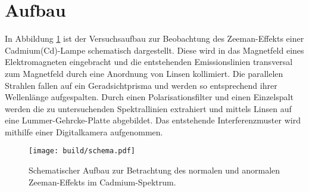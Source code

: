 \section{Aufbau}
\label{sec:Aufbau}

In Abbildung \ref{fig:schema} ist der Versuchsaufbau zur Beobachtung des Zeeman-Effekts einer Cadmium(Cd)-Lampe schematisch dargestellt.
Diese wird in das Magnetfeld eines Elektromagneten eingebracht und die entstehenden Emissionslinien transversal zum Magnetfeld durch eine Anordnung von Linsen kollimiert. Die parallelen Strahlen fallen auf ein Geradsichtprisma und werden so entsprechend ihrer Wellenlänge aufgespalten. Durch einen Polarisationsfilter und einen Einzelspalt werden die zu untersuchenden Spektrallinien extrahiert und mittels Linsen auf eine Lummer-Gehrcke-Platte abgebildet. Das entstehende Interferenzmuster wird mithilfe einer Digitalkamera aufgenommen.

\begin{figure}
\centering
\texttt{[image: build/schema.pdf]}
\caption{Schematischer Aufbau zur Betrachtung des normalen und anormalen Zeeman-Effekts im Cadmium-Spektrum.\cite{V27}}
\label{fig:schema}
\end{figure}


